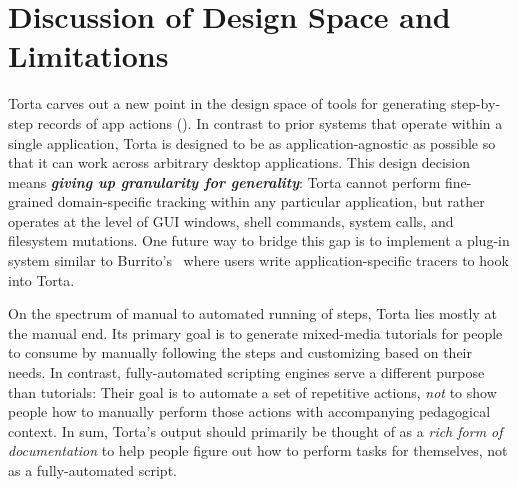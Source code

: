 \section{Discussion of Design Space and Limitations}

Torta carves out a new point in the design space of
tools for generating step-by-step records of app actions
().
%
In contrast to prior systems that operate within a single application,
Torta is designed to be as application-agnostic as possible so that it
can work across arbitrary desktop applications. This design decision
means \textbf{\emph{giving up granularity for generality}}: Torta cannot perform
fine-grained domain-specific tracking within any particular application, but
rather operates at the level of GUI windows, shell commands, system
calls, and filesystem mutations. One future way to bridge this gap is to
implement a plug-in system similar to Burrito's~\cite{GuoBurrito2012} where users write
application-specific tracers to hook into Torta.


On the spectrum of manual to automated running of steps, Torta lies
mostly at the manual end. Its primary goal is to generate mixed-media
tutorials for people to consume by manually following the steps and
customizing based on their needs. In contrast, fully-automated scripting
engines serve a different purpose than tutorials: Their goal is to
automate a set of repetitive actions, \emph{not} to show people how to
manually perform those actions with accompanying pedagogical context. In sum,
Torta's output should primarily be thought of as a \emph{rich form of
documentation} to help people figure out how to perform tasks for themselves,
not as a fully-automated script.


